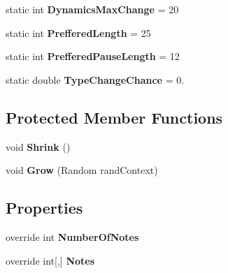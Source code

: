 \begin{DoxyCompactItemize}
\item 
\hypertarget{class_music_population_1_1_member2_ab87cfb3d5ff661c6a18aa8e79d41c20e}{static int {\bfseries Dynamics\+Max\+Change} = 20}\label{class_music_population_1_1_member2_ab87cfb3d5ff661c6a18aa8e79d41c20e}

\item 
\hypertarget{class_music_population_1_1_member2_a73edca70ed1d84402130a22bb2161970}{static int {\bfseries Preffered\+Length} = 25}\label{class_music_population_1_1_member2_a73edca70ed1d84402130a22bb2161970}

\item 
\hypertarget{class_music_population_1_1_member2_a85f949dc40d734b10de8c6bd5e64ecb7}{static int {\bfseries Preffered\+Pause\+Length} = 12}\label{class_music_population_1_1_member2_a85f949dc40d734b10de8c6bd5e64ecb7}

\item 
\hypertarget{class_music_population_1_1_member2_ab57206a0fe05c538448f8c1f39807ee8}{static double {\bfseries Type\+Change\+Chance} = 0.}\label{class_music_population_1_1_member2_ab57206a0fe05c538448f8c1f39807ee8}

\end{DoxyCompactItemize}
\subsection*{Protected Member Functions}
\begin{DoxyCompactItemize}
\item 
\hypertarget{class_music_population_1_1_member2_abae4582df340f8a7906b50fdcff5a445}{void {\bfseries Shrink} ()}\label{class_music_population_1_1_member2_abae4582df340f8a7906b50fdcff5a445}

\item 
\hypertarget{class_music_population_1_1_member2_ae5b7fc755e529b2a03c8e60996ea782e}{void {\bfseries Grow} (Random rand\+Context)}\label{class_music_population_1_1_member2_ae5b7fc755e529b2a03c8e60996ea782e}

\end{DoxyCompactItemize}
\subsection*{Properties}
\begin{DoxyCompactItemize}
\item 
\hypertarget{class_music_population_1_1_member2_a1c0d24f13a1add473466eee243f54b30}{override int {\bfseries Number\+Of\+Notes}}\label{class_music_population_1_1_member2_a1c0d24f13a1add473466eee243f54b30}

\item 
\hypertarget{class_music_population_1_1_member2_ae73d7137c58d2f40c8f5849c836af4c1}{override int\mbox{[},\mbox{]} {\bfseries Notes}}\label{class_music_population_1_1_member2_ae73d7137c58d2f40c8f5849c836af4c1}

\end{DoxyCompactItemize}
